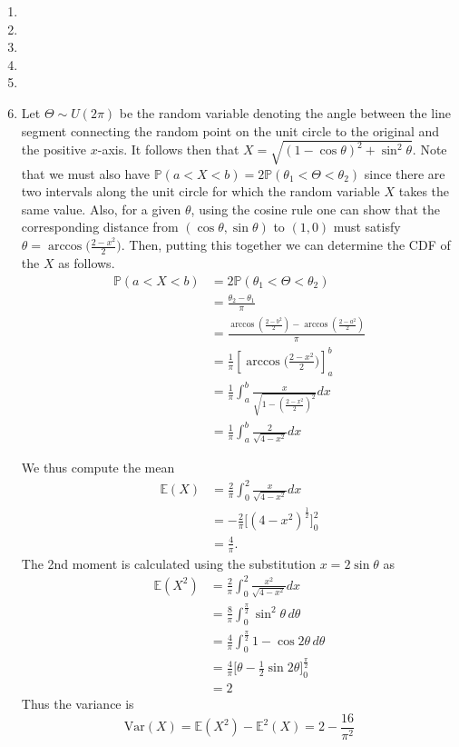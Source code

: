 \documentclass{article}
\begin{document}
\begin{enumerate}
    \item 

    \item 

    \item 

    \item 

    \item 

    \item Let \(\Theta \sim U(2\pi)  \) be the random variable denoting the angle between the line segment connecting the random point on the unit circle to the original and the positive \(x\)-axis. It follows then that \(X=\sqrt{(1-\cos\theta)^2+\sin^2\theta}\). Note that we must also have \(\mathbb{P}(a<X<b)= 2\mathbb{P}(\theta_1 < \Theta < \theta_2)\) since there are two intervals along the unit circle for which the random variable \(X\) takes the same value. Also, for a given \(\theta\), using the cosine rule one can show that the corresponding distance from \((\cos\theta, \sin\theta)\) to \((1,0)\) must satisfy \(\theta=\arccos{\big(\frac{2-x^2}{2}\big)}\). Then, putting this together we can determine the CDF of the \(X\) as follows.
    \begin{align*}
        \mathbb{P}(a<X<b) &= 2\mathbb{P}(\theta_1 < \Theta < \theta_2) \\
        &= \frac{\theta_2-\theta_1}{\pi} \\
        &= \frac{\arccos(\frac{2-b^2}{2})-\arccos{(\frac{2-a^2}{2})}}{\pi} \\
        &= \frac{1}{\pi}[\arccos{\Big(\frac{2-x^2}{2}\Big)}]_a^b \\
        &= \frac{1}{\pi} \int_a^b \frac{x}{\sqrt{
        1-(\frac{2-x^2}{2})^2 }} dx \\
        &= \frac{1}{\pi}\int_a^b \frac{2}{\sqrt{4-x^2}} dx 
    \end{align*}

    We thus compute the mean
    \begin{align*}
        \mathbb{E}(X) &= \frac{2}{\pi}\int_0^2 \frac{x}{\sqrt{4-x^2}} dx \\
        &= -\frac{2}{\pi}\Big[(4-x^2)^\frac{1}{2}\Big]_0^2 \\
        &= \frac{4}{\pi}.
    \end{align*}
    The 2nd moment is calculated using the substitution \(x=2\sin\theta\) as
    \begin{align*}
        \mathbb{E}(X^2) &= \frac{2}{\pi}\int_0^2 \frac{x^2}{\sqrt{4-x^2}} dx \\
        &= \frac{8}{\pi}\int_0^\frac{\pi}{2} \sin^2\theta \, d\theta \\
        &= \frac{4}{\pi} \int_0^\frac{\pi}{2} 1-\cos2\theta \, d\theta \\
        &= \frac{4}{\pi}\Big[ \theta -\frac{1}{2}\sin2\theta\Big]_0^\frac{\pi}{2} \\
        &= 2
    \end{align*}
    Thus the variance is
    \[
    \text{Var}(X) = \mathbb{E}(X^2)-\mathbb{E}^2(X) = 2 - \frac{16}{\pi^2}
    \]


\end{enumerate}
\end{document}
